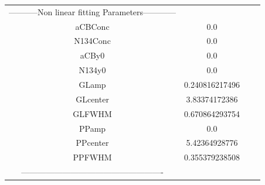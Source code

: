 \documentclass{article}
\begin{document}
\begin{tabular}{c c c c}

-----------Non linear fitting Parameters------------\\
aCBConc    &0.0\\
N134Conc   &0.0\\
aCBy0      &0.0\\
N134y0     &0.0\\
GLamp      &0.240816217496\\
GLcenter   &3.83374172386\\
GLFWHM     &0.670864293754\\
PPamp      &0.0\\
PPcenter   &5.42364928776\\
PPFWHM     &0.355379238508\\
----------------------------------------------------\\


\end{tabular}
\end{document}
